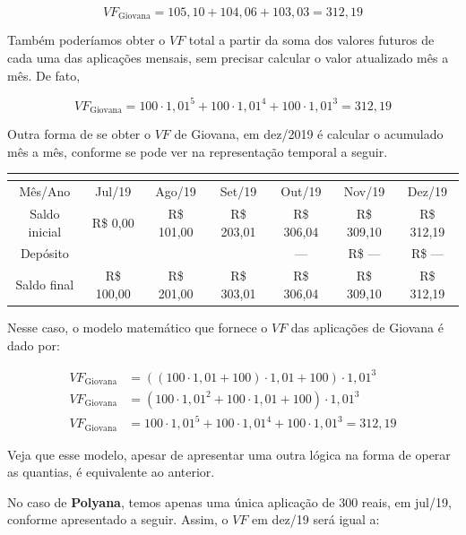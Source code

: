 $$VF_{\text{Giovana}}=105{,}10 + 104{,}06 + 103{,}03 = 312{,}19$$

Também poderíamos obter o $VF$ total a partir da soma dos valores futuros de cada uma das aplicações mensais, sem precisar calcular o valor atualizado mês a mês. De fato,

$$VF_{\text{Giovana}}=100\cdot1{,}01^5 + 100\cdot1{,}01^4 + 100\cdot1{,}01^3 = 312{,}19$$

Outra forma de se obter o $VF$ de Giovana, em dez/2019 é calcular o acumulado mês a mês, conforme se pode ver na representação temporal a seguir.

\begin{table}[H]
\centering
\begin{tabu} to \textwidth{|c|c|c|c|c|c|c|}
\hline
{}\\
\hline
Mês/Ano & Jul/19 & Ago/19 & Set/19 & Out/19 & Nov/19 & Dez/19 \\
\hline
Saldo inicial & R\$ 0,00 & R\$ 101,00 & R\$ 203,01 & R\$ 306,04 & R\$ 309,10 & R\$ 312,19 \\
\hline
Depósito & {} & {} & {} & --- & R\$ --- & R\$ ---\\
\hline
Saldo final & R\$ 100,00 & R\$ 201,00 & R\$ 303,01 &R\$ 306,04 & R\$ 309,10 & R\$ 312,19 \\
\hline
\end{tabu}
\end{table}

Nesse caso, o modelo matemático que fornece o $VF$ das aplicações de Giovana é dado por:

\begin{align*}
VF_{\text{Giovana}}&=((100\cdot1{,}01+100)\cdot1{,}01+100)\cdot1{,}01^3\\
VF_{\text{Giovana}}&=(100\cdot1{,}01^2+100\cdot1{,}01+100)\cdot1{,}01^3\\
VF_{\text{Giovana}}&=100\cdot1{,}01^5 + 100\cdot1{,}01^4 + 100\cdot1{,}01^3 = 312{,}19
\end{align*}


Veja que esse modelo, apesar de apresentar uma outra lógica na forma de operar as quantias, é equivalente ao anterior. 

No caso de \textbf{Polyana}, temos apenas uma única aplicação de 300 reais, em jul/19, conforme apresentado a seguir. Assim, o $VF$ em dez/19 será igual a:

